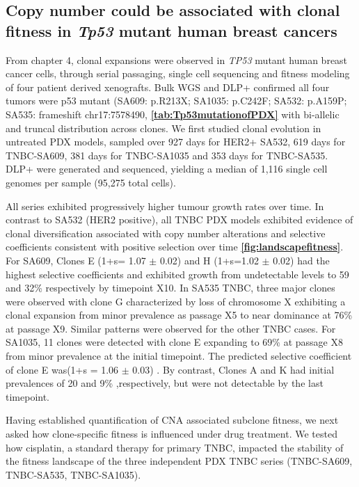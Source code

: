 \subsection{Copy number could be associated with clonal fitness in \textit{Tp53} mutant human breast cancers}
From chapter 4, clonal expansions were observed in \textit{TP53} mutant human breast cancer cells, through serial passaging, single cell sequencing and fitness modeling of four patient derived xenografts. Bulk WGS and DLP+ confirmed all four tumors were p53 mutant (SA609: p.R213X; SA1035: p.C242F; SA532: p.A159P; SA535: frameshift chr17:7578490, \textbf{\autoref{tab:Tp53mutationofPDX}} with bi-allelic and truncal distribution across clones.
We first studied clonal evolution in untreated PDX models, sampled over 927 days for HER2+ SA532, 619 days for TNBC-SA609, 381 days for TNBC-SA1035 and 353 days for TNBC-SA535. DLP+ were generated and sequenced, yielding a median of 1,116 single cell genomes per sample (95,275 total cells). 

All series exhibited progressively higher tumour growth rates over time. In contrast to SA532 (HER2 positive), all TNBC PDX models exhibited evidence of clonal diversification associated with copy number alterations and selective coefficients consistent with positive selection over time \textbf{\autoref{fig:landscapefitness}}. 
For SA609, Clones E  (1+s= 1.07 $\pm$ 0.02) and H (1+s=1.02 $\pm$ 0.02) had the highest selective coefficients and exhibited growth from undetectable levels to 59 and 32\% respectively by timepoint X10.
In SA535 TNBC, three major clones were observed with clone G characterized by loss of chromosome X exhibiting a clonal expansion from minor prevalence as passage X5 to near dominance at 76\% at passage X9. Similar patterns were observed for the other TNBC cases.  
For SA1035, 11 clones were detected with clone E expanding to 69\% at passage X8 from minor prevalence at the initial timepoint. The predicted selective coefficient of clone E was(1+s = 1.06 $\pm$ 0.03) . By contrast, Clones A and K had initial prevalences of 20 and 9\% ,respectively, but were not detectable by the last timepoint. 

Having established quantification of CNA associated subclone fitness, we next asked how clone-specific fitness is influenced under drug treatment. We tested how cisplatin, a standard therapy for primary TNBC, impacted the stability of the fitness landscape of the three independent PDX TNBC series (TNBC-SA609, TNBC-SA535, TNBC-SA1035).

